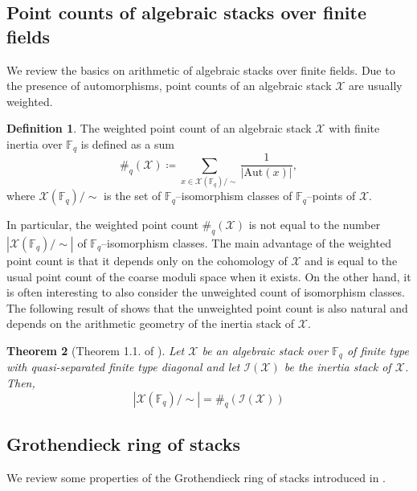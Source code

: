 \documentclass[a4paper,12pt]{amsart}
\newtheorem{thm}{Theorem}[section]
\theoremstyle{definition}
\newtheorem{defn}[thm]{Definition}
\newcommand{\cX}{\mathcal{X}}
\newcommand{\Ic}{\mathcal{I}}
\newcommand{\Fb}{\mathbb{F}}
\begin{document}
	
	\subsection{Point counts of algebraic stacks over finite fields}
	
	We review the basics on arithmetic of algebraic stacks over finite fields. Due to the presence of automorphisms, point counts of an algebraic stack $\cX$ are usually weighted.
	
	
	
	\begin{defn}\label{def:wtcount}
		The weighted point count of an algebraic stack $\cX$ with finite inertia over $\Fb_q$ is defined as a sum
		\[
		\#_q(\cX)\coloneqq\sum_{x \in \cX(\Fb_q)/\sim}\frac{1}{|\mathrm{Aut}(x)|},
		\]
		where $\cX(\Fb_q)/\sim$ is the set of $\Fb_q$--isomorphism classes of $\Fb_q$--points of $\cX$.
	\end{defn}
	
	
	In particular, the weighted point count $\#_q(\cX)$ is not equal to the number $|\cX(\Fb_q)/\sim|$ of $\Fb_q$--isomorphism classes. The main advantage of the weighted point count is that it depends only on the cohomology of $\cX$ and is equal to the usual point count of the coarse moduli space when it exists. On the other hand, it is often interesting to also consider the unweighted count of isomorphism classes. The following result of \cite{HP2} shows that the unweighted point count is also natural and depends on the arithmetic geometry of the inertia stack of $\cX$. 
	
	
	\begin{thm}[Theorem 1.1. of \cite{HP2}] \label{thm:ptcounts}
		Let $\cX$ be an algebraic stack over $\Fb_q$ of finite type with quasi-separated finite type diagonal and let $\Ic(\cX)$ be the inertia stack of $\cX$. Then, 
		$$ |\cX(\Fb_q)/\sim| = \#_q(\Ic(\cX))$$ 
	\end{thm}
	
	
	
	\subsection{Grothendieck ring of stacks}\label{subsec:K0}
	
	
	We review some properties of the Grothendieck ring of stacks introduced in \cite{Ekedahl}. 
	
\end{document}
